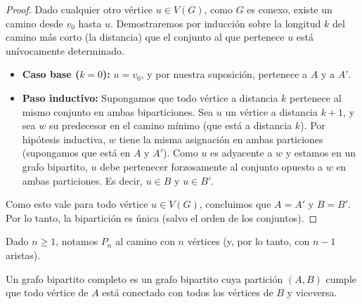 \begin{proof}
    Dado cualquier otro vértice \(u \in V(G)\), como \(G\) es conexo, existe un camino desde \(v_0\) hasta \(u\). Demostraremos por inducción sobre la longitud \(k\) del camino más corto (la distancia) que el conjunto al que pertenece \(u\) está unívocamente determinado.
    \begin{itemize}
        \item \textbf{Caso base (\(k=0\)):} \(u = v_0\), y por nuestra suposición, pertenece a \(A\) y a \(A'\).
        \item \textbf{Paso inductivo:} Supongamos que todo vértice a distancia \(k\) pertenece al mismo conjunto en ambas biparticiones. Sea \(u\) un vértice a distancia \(k+1\), y sea \(w\) su predecesor en el camino mínimo (que está a distancia \(k\)).
              Por hipótesis inductiva, \(w\) tiene la misma asignación en ambas particiones (supongamos que está en \(A\) y \(A'\)). Como \(u\) es adyacente a \(w\) y estamos en un grafo bipartito, \(u\) debe pertenecer forzosamente al conjunto opuesto a \(w\) en ambas particiones. Es decir, \(u \in B\) y \(u \in B'\).
    \end{itemize}
    Como esto vale para todo vértice \(u \in V(G)\), concluimos que \(A = A'\) y \(B = B'\). Por lo tanto, la bipartición es única (salvo el orden de los conjuntos).
\end{proof}

\vspace{0.5cm}

\begin{definition}
    Dado \( n \geq 1 \), notamos \( P_n \) al camino con \( n \) vértices (y, por lo tanto, con \( n-1 \) aristas).
\end{definition}

\begin{definition}
    Un grafo bipartito completo es un grafo bipartito cuya partición \((A, B)\) cumple que todo vértice de \(A\) está conectado con todos los vértices de \(B\) y viceversa.
\end{definition}

